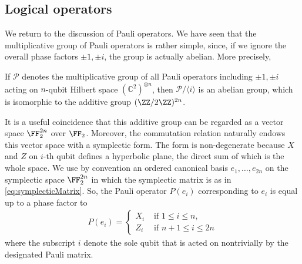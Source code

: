 \subsection{Logical operators}

We return to the discussion of Pauli operators.
We have seen that the multiplicative group of Pauli operators
is rather simple, since, if we ignore the overall phase factors $\pm 1, \pm i$,
the group is actually abelian. More precisely,
\begin{prop}
If $\mathcal P$ denotes the multiplicative group of all Pauli operators including $\pm 1, \pm i$
acting on $n$-qubit Hilbert space $(\mathbb C^2)^{\otimes n}$,
then $\mathcal P / \langle i \rangle$ is an abelian group, which is isomorphic to the additive group 
$(\ZZ/2\ZZ)^{2n}$.
\end{prop}
\noindent
It is a useful coincidence that this additive group can be regarded as a vector space $\FF_2^{2n}$ over $\FF_2$.
Moreover, the commutation relation naturally endows this vector space
with a symplectic form.
The form is non-degenerate because $X$ and $Z$ on $i$-th qubit defines a hyperbolic plane,
the direct sum of which is the whole space.
We use by convention an ordered canonical basis $e_1,\ldots, e_{2n}$ on the symplectic space $\FF_2^{2n}$
in which the symplectic matrix is as in \eqref{eq:symplecticMatrix}.
So, the Pauli operator $P(e_i)$ corresponding to $e_i$ is equal up to a phase factor to
\begin{align}
 P(e_i) = \begin{cases} X_i & \text{ if } 1 \le i \le n, \\ Z_i &\text{ if } n+1 \le i \le 2n \end{cases}
\end{align}
where the subscript $i$ denote the sole qubit that is acted on nontrivially by the designated Pauli matrix.

